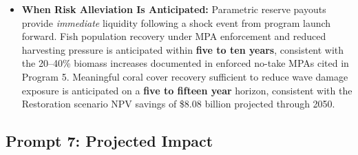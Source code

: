 \documentclass[10pt,letterpaper]{article}
\newcounter{metric}
\newcounter{gs}
\begin{document}
\begin{itemize}
    \item \textbf{When Risk Alleviation Is Anticipated:} Parametric reserve payouts provide \textit{immediate} liquidity following a shock event from program launch forward. Fish population recovery under MPA enforcement and reduced harvesting pressure is anticipated within \textbf{five to ten years}, consistent with the 20--40\% biomass increases documented in enforced no-take MPAs cited in Program 5. Meaningful coral cover recovery sufficient to reduce wave damage exposure is anticipated on a \textbf{five to fifteen year} horizon, consistent with the Restoration scenario NPV savings of \$8.08 billion projected through 2050.

\end{itemize}

\subsection*{Prompt 7: Projected Impact}
\end{document}
